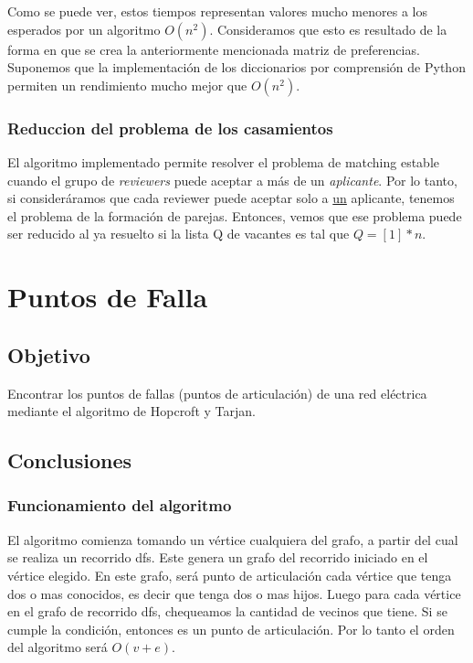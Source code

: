 \documentclass{article}
\begin{document}
                Como se puede ver, estos tiempos representan valores mucho menores a
                los esperados por un algoritmo $O(n^2)$. Consideramos que esto es
                resultado de la forma en que se crea la anteriormente mencionada
                matriz de preferencias. Suponemos que la implementación de los
                diccionarios por comprensión de Python permiten un rendimiento mucho
                mejor que $O(n^2)$.
            \subsubsection{Reduccion del problema de los casamientos}
                El algoritmo implementado permite resolver el problema de matching
                estable cuando el grupo de \emph{reviewers} puede aceptar a más de
                un \emph{aplicante}. Por lo tanto, si consideráramos que cada reviewer
                puede aceptar solo a \underline{un} aplicante, tenemos el problema
                de la formación de parejas. Entonces, vemos que ese problema
                puede ser reducido al ya resuelto si la lista Q de vacantes es tal
                que $Q = [1]*n$.

    \section{Puntos de Falla}
        \subsection{Objetivo}
            Encontrar los puntos de fallas (puntos de articulación) de una red eléctrica
            mediante el algoritmo de Hopcroft y Tarjan.
        \subsection{Conclusiones}
            \subsubsection{Funcionamiento del algoritmo}
                El algoritmo comienza tomando un vértice cualquiera del grafo, a partir
                del cual se realiza un recorrido dfs. Este genera un grafo del recorrido
                iniciado en el vértice elegido. En este grafo, será punto de articulación
                cada vértice que tenga dos o mas conocidos, es decir que tenga dos o mas
                hijos. Luego para cada vértice en el grafo de recorrido dfs, chequeamos
                la cantidad de vecinos que tiene. Si se cumple la condición, entonces es un punto
                de articulación. Por lo tanto el orden del algoritmo será $O(v+e)$.
\end{document}
